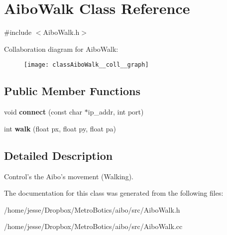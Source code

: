 \hypertarget{classAiboWalk}{
\section{AiboWalk Class Reference}
\label{classAiboWalk}
}


{\ttfamily \#include $<$AiboWalk.h$>$}



Collaboration diagram for AiboWalk:\nopagebreak
\begin{figure}[H]
\begin{center}
\leavevmode
\texttt{[image: classAiboWalk\_\_coll\_\_graph]}
\end{center}
\end{figure}
\subsection*{Public Member Functions}
\begin{DoxyCompactItemize}
\item 
\hypertarget{classAiboWalk_a857c76fad5c90bb2de03999c545b7488}{
void {\bfseries connect} (const char $\ast$ip\_\-addr, int port)}
\label{classAiboWalk_a857c76fad5c90bb2de03999c545b7488}

\item 
\hypertarget{classAiboWalk_ace69bca076d0091769b1af5ca7636953}{
int {\bfseries walk} (float px, float py, float pa)}
\label{classAiboWalk_ace69bca076d0091769b1af5ca7636953}

\end{DoxyCompactItemize}


\subsection{Detailed Description}
Control's the Aibo's movement (Walking). 

The documentation for this class was generated from the following files:\begin{DoxyCompactItemize}
\item 
/home/jesse/Dropbox/MetroBotics/aibo/src/AiboWalk.h\item 
/home/jesse/Dropbox/MetroBotics/aibo/src/AiboWalk.cc\end{DoxyCompactItemize}
